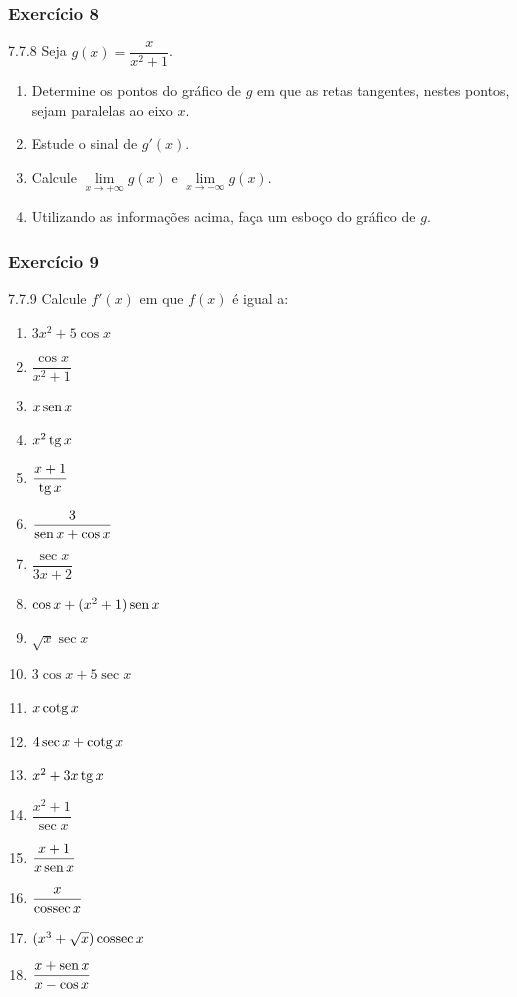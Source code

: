 \subsubsection*{Exercício 8}
\begin{exercicio}[8]{7.7.8}
Seja $g(x) = \dfrac{x}{x^2 + 1}$.
\begin{enumerate}[label=\alph*)]
    \item Determine os pontos do gráfico de $g$ em que as retas tangentes, nestes pontos, sejam paralelas ao eixo $x$.
    \item Estude o sinal de $g'(x)$.
    \item Calcule $\lim\limits_{x \to +\infty} g(x)$ e $\lim\limits_{x \to -\infty} g(x)$.
    \item Utilizando as informações acima, faça um esboço do gráfico de $g$.
\end{enumerate}
\end{exercicio}

\subsubsection*{Exercício 9}
\begin{exercicio}[9]{7.7.9}
Calcule $f'(x)$ em que $f(x)$ é igual a:
\begin{enumerate}[label=\alph*)]
    \item $3x^2 + 5\cos x$
    \item $\dfrac{\cos x}{x^2 + 1}$
    \item $x\operatorname{sen} x$
    \item $x^2 \operatorname{tg} x$
    \item $\dfrac{x + 1}{\operatorname{tg} x}$
    \item $\dfrac{3}{\operatorname{sen} x + \cos x}$
    \item $\dfrac{\sec x}{3x + 2}$
    \item $\cos x + (x^2 + 1)\operatorname{sen} x$
    \item $\sqrt{x}\sec x$
    \item $3\cos x + 5\sec x$
    \item $x\operatorname{cotg} x$
    \item $4\sec x + \operatorname{cotg} x$
    \item $x^2 + 3x\operatorname{tg} x$
    \item $\dfrac{x^2 + 1}{\sec x}$
    \item $\dfrac{x + 1}{x\operatorname{sen} x}$
    \item $\dfrac{x}{\operatorname{cossec} x}$
    \item $(x^3 + \sqrt{x})\operatorname{cossec} x$
    \item $\dfrac{x + \operatorname{sen} x}{x - \cos x}$
\end{enumerate}
\end{exercicio}

